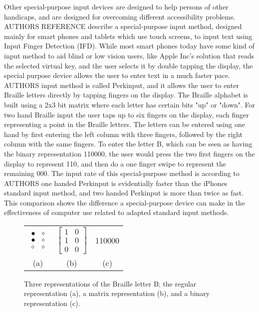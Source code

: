 Other special-purpose input devices are designed to help persons of other handicaps, and are designed for overcoming different accessibility problems. AUTHORS REFERENCE describe a special-purpose input method, designed mainly for smart phones and tablets which use touch screens, to input text using Input Finger Detection (IFD). While most smart phones today have some kind of input method to aid blind or low vision users, like Apple Inc's solution that reads the selected virtual key, and the user selects it by double tapping the display, the special purpose device allows the user to enter text in a much faster pace. AUTHORS input method is called Perkinput, and it allows the user to enter Braille letters directly by tapping fingers on the display. The Braille alphabet is built using a 2x3 bit matrix where each letter has certain bits "up" or "down". For two hand Braille input the user taps up to six fingers on the display, each finger representing a point in the Braille letters. The letters can be entered using one hand by first entering the left column with three fingers, followed by the right column with the same fingers. To enter the letter B, which can be seen as having the binary representation 110000, the user would press the two first fingers on the display to represent 110, and then do a one finger swipe to represent the remaining 000. The input rate of this special-purpose method is according to AUTHORS one handed Perkinput is evidentially faster than the iPhones standard input method, and two handed Perkinput is more than twice as fast. This comparison shows the difference a special-purpose device can make in the effectiveness of computer use related to adapted standard input methods. 

\begin{figure}[h!]

	\centering

\begin{tabular}{c c c}

$
\begin{array}{cc}
\bullet & \circ \\
\bullet & \circ \\
\circ & \circ \end{array}
$

&

$
\left[ \begin{array}{cc}
1 & 0 \\
1 & 0 \\
0 & 0 \end{array} \right]
$ 

&

110000 \\

(a) & (b) & (c)

\end{tabular}


	\caption{Three representations of the Braille letter B; the regular representation (a), a matrix representation (b), and a binary representation (c).}

\end{figure}

